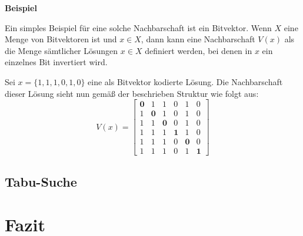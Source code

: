 \textbf{Beispiel}

Ein simples Beispiel für eine solche Nachbarschaft ist ein Bitvektor. Wenn $X$ eine Menge
von Bitvektoren ist und $x \in X$, dann kann eine Nachbarschaft $V(x)$ als die Menge
sämtlicher Lösungen $x \in X$ definiert werden, bei denen in $x$ ein einzelnes Bit invertiert wird. \cite{Pirlot1996}

Sei $x = \{1, 1, 1, 0, 1, 0\}$ eine als Bitvektor kodierte Lösung.
Die Nachbarschaft dieser Lösung sieht nun gemäß der beschrieben Struktur wie folgt aus:
\[
V(x) =
  \begin{bmatrix}
    \boldsymbol{0} & 1 & 1 & 0 & 1 & 0 \\
    1 & \boldsymbol{0} & 1 & 0 & 1 & 0 \\
    1 & 1 & \boldsymbol{0} & 0 & 1 & 0 \\
    1 & 1 & 1 & \boldsymbol{1} & 1 & 0 \\
    1 & 1 & 1 & 0 & \boldsymbol{0} & 0 \\
    1 & 1 & 1 & 0 & 1 & \boldsymbol{1}
  \end{bmatrix}
\]

\pagebreak

\subsection{Tabu-Suche}
\label{sec:tabu_seach}

\pagebreak

\section{Fazit}
\label{sec:conclusion}
